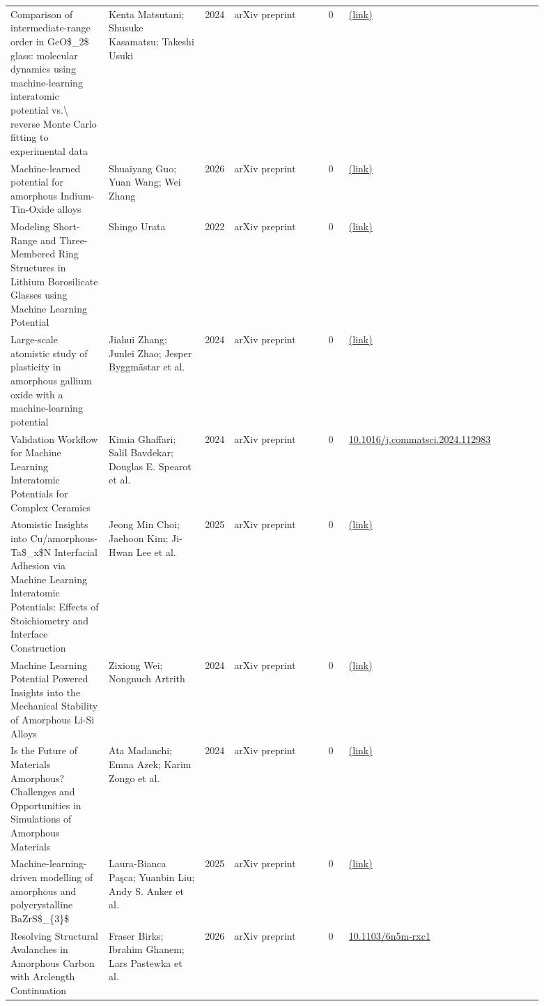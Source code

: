 \documentclass[10pt,a4paper]{article}
\begin{document}
{\begin{longtable}{p{0.192\linewidth}p{0.192\linewidth}p{0.043\linewidth}p{0.192\linewidth}p{0.043\linewidth}p{0.132\linewidth}p{0.096\linewidth}}
Comparison of intermediate-range order in GeO\$\_2\$ glass: molecular dynamics using machine-learning interatomic potential vs.\textbackslash{} reverse Monte Carlo fitting to experimental data & Kenta Matsutani; Shusuke Kasamatsu; Takeshi Usuki & 2024 & arXiv preprint & 0 & \href{http://arxiv.org/abs/2409.06982v2}{(link)} &  \\
Machine-learned potential for amorphous Indium-Tin-Oxide alloys & Shuaiyang Guo; Yuan Wang; Wei Zhang & 2026 & arXiv preprint & 0 & \href{http://arxiv.org/abs/2601.00145v1}{(link)} &  \\
Modeling Short-Range and Three-Membered Ring Structures in Lithium Borosilicate Glasses using Machine Learning Potential & Shingo Urata & 2022 & arXiv preprint & 0 & \href{http://arxiv.org/abs/2209.00316v2}{(link)} &  \\
Large-scale atomistic study of plasticity in amorphous gallium oxide with a machine-learning potential & Jiahui Zhang; Junlei Zhao; Jesper Byggmästar et al. & 2024 & arXiv preprint & 0 & \href{http://arxiv.org/abs/2404.17353v1}{(link)} &  \\
Validation Workflow for Machine Learning Interatomic Potentials for Complex Ceramics & Kimia Ghaffari; Salil Bavdekar; Douglas E. Spearot et al. & 2024 & arXiv preprint & 0 & \href{https://doi.org/10.1016/j.commatsci.2024.112983}{10.1016/j.commatsci.2024.112983} &  \\
Atomistic Insights into Cu/amorphous-Ta\$\_x\$N Interfacial Adhesion via Machine Learning Interatomic Potentials: Effects of Stoichiometry and Interface Construction & Jeong Min Choi; Jaehoon Kim; Ji-Hwan Lee et al. & 2025 & arXiv preprint & 0 & \href{http://arxiv.org/abs/2509.20662v2}{(link)} &  \\
Machine Learning Potential Powered Insights into the Mechanical Stability of Amorphous Li-Si Alloys & Zixiong Wei; Nongnuch Artrith & 2024 & arXiv preprint & 0 & \href{http://arxiv.org/abs/2402.08834v1}{(link)} &  \\
Is the Future of Materials Amorphous? Challenges and Opportunities in Simulations of Amorphous Materials & Ata Madanchi; Emna Azek; Karim Zongo et al. & 2024 & arXiv preprint & 0 & \href{http://arxiv.org/abs/2410.05035v2}{(link)} &  \\
Machine-learning-driven modelling of amorphous and polycrystalline BaZrS\$\_\{3\}\$ & Laura-Bianca Paşca; Yuanbin Liu; Andy S. Anker et al. & 2025 & arXiv preprint & 0 & \href{http://arxiv.org/abs/2506.01517v1}{(link)} &  \\
Resolving Structural Avalanches in Amorphous Carbon with Arclength Continuation & Fraser Birks; Ibrahim Ghanem; Lars Pastewka et al. & 2026 & arXiv preprint & 0 & \href{https://doi.org/10.1103/6n5m-rxc1}{10.1103/6n5m-rxc1} &  \\

\end{longtable}}
\end{document}
